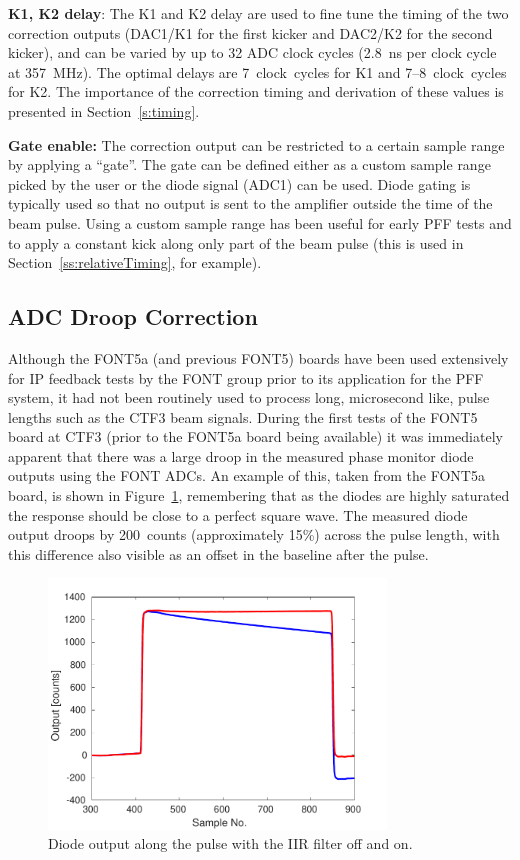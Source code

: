 \textbf{K1, K2 delay}: The K1 and K2 delay are used to fine tune the timing of the two correction outputs (DAC1/K1 for the first kicker and DAC2/K2 for the second kicker), and can be varied by up to 32 ADC clock cycles (2.8~ns per clock cycle at 357~MHz). The optimal delays are 7~clock~cycles for K1 and 7--8~clock~cycles for K2. The importance of the correction timing and derivation of these values is presented in Section~\ref{s:timing}.

\textbf{Gate enable:} The correction output can be restricted to a certain sample range by applying a ``gate''. The gate can be defined either as a custom sample range picked by the user or the diode signal (ADC1) can be used. Diode gating is typically used so that no output is sent to the amplifier outside the time of the beam pulse. Using a custom sample range has been useful for early PFF tests and to apply a constant kick along only part of the beam pulse (this is used in Section~\ref{ss:relativeTiming}, for example).


\subsection{ADC Droop Correction}
\label{ss:droopCorr}

Although the FONT5a (and previous FONT5) boards have been used extensively for IP feedback tests by the FONT group prior to its application for the PFF system, it had not been routinely used to process long, microsecond like, pulse lengths such as the CTF3 beam signals. During the first tests of the FONT5 board at CTF3 (prior to the FONT5a board being available) it was immediately apparent that there was a large droop in the measured phase monitor diode outputs using the FONT ADCs. An example of this, taken from the FONT5a board, is shown in Figure~\ref{f:iirDiodefiltOffOn}, remembering that as the diodes are highly saturated the response should be close to a perfect square wave. The measured diode output droops by 200~counts (approximately 15\%) across the pulse length, with this difference also visible as an offset in the baseline after the pulse.

\begin{figure}
  \centering
  \includegraphics[width=0.8\textwidth]{Figures/commissioning/iirDiodeFiltOffOn}
  \caption{Diode output along the pulse with the IIR filter off and on.}
  \label{f:iirDiodefiltOffOn}
\end{figure}

